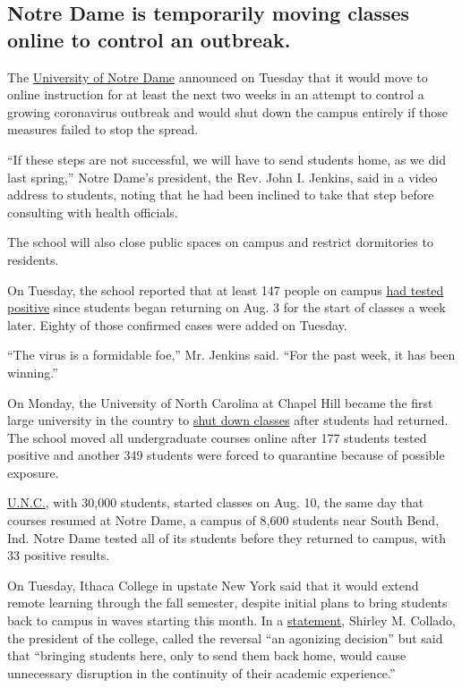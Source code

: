 \hypertarget{notre-dame-is-temporarily-moving-classes-online-to-control-an-outbreak}{%
\subsection{Notre Dame is temporarily moving classes online to control
an
outbreak.}\label{notre-dame-is-temporarily-moving-classes-online-to-control-an-outbreak}}

The
\href{https://www.nytimes3xbfgragh.onion/2020/08/18/us/notre-dame-coronavirus.html}{University
of Notre Dame} announced on Tuesday that it would move to online
instruction for at least the next two weeks in an attempt to control a
growing coronavirus outbreak and would shut down the campus entirely if
those measures failed to stop the spread.

``If these steps are not successful, we will have to send students home,
as we did last spring,'' Notre Dame's president, the Rev. John I.
Jenkins, said in a video address to students, noting that he had been
inclined to take that step before consulting with health officials.

The school will also close public spaces on campus and restrict
dormitories to residents.

On Tuesday, the school reported that at least 147 people on campus
\href{https://here.nd.edu/our-approach/dashboard/}{had tested positive}
since students began returning on Aug. 3 for the start of classes a week
later. Eighty of those confirmed cases were added on Tuesday.

``The virus is a formidable foe,'' Mr. Jenkins said. ``For the past
week, it has been winning.''

On Monday, the University of North Carolina at Chapel Hill became the
first large university in the country to
\href{https://www.nytimes3xbfgragh.onion/2020/08/17/us/unc-chapel-hill-covid.html}{shut
down classes} after students had returned. The school moved all
undergraduate courses online after 177 students tested positive and
another 349 students were forced to quarantine because of possible
exposure.

\href{https://www.nytimes3xbfgragh.onion/2020/08/18/sports/ncaafootball/unc-football-acc-online-classes.html}{U.N.C.},
with 30,000 students, started classes on Aug. 10, the same day that
courses resumed at Notre Dame, a campus of 8,600 students near South
Bend, Ind. Notre Dame tested all of its students before they returned to
campus, with 33 positive results.

On Tuesday, Ithaca College in upstate New York said that it would extend
remote learning through the fall semester, despite initial plans to
bring students back to campus in waves starting this month. In a
\href{https://www.ithaca.edu/news/revised-plan-fall-opening}{statement},
Shirley M. Collado, the president of the college, called the reversal
``an agonizing decision'' but said that ``bringing students here, only
to send them back home, would cause unnecessary disruption in the
continuity of their academic experience.''

